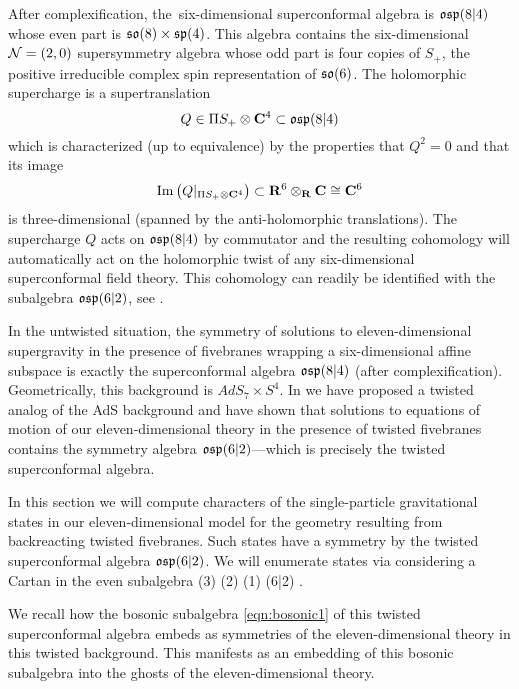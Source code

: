 After complexification, the~six-dimensional superconformal algebra is $\mathfrak{osp}(8|4)$ whose even part is $\mathfrak{so}(8) \times \mathfrak{sp}(4)$. 
This algebra contains the six-dimensional $\mathcal N=(2,0)$ supersymmetry algebra whose odd part is four copies of $S_+$, the positive irreducible complex spin representation of $\mathfrak{so}(6)$.
The holomorphic supercharge is a supertranslation 
\[
Q \in \Pi S_+ \otimes \mathbf{C}^4 \subset \mathfrak{osp}(8|4)
\]
which is characterized (up to equivalence) by the properties that $Q^2 = 0$ and that its image
\[
{\rm Im}\left(Q|_{\Pi S_+ \otimes \mathbf{C}^4} \right) \subset \mathbf{R}^6 \otimes_{\mathbf{R}} \mathbf{C} \cong \mathbf{C}^6
\]
is three-dimensional (spanned by the anti-holomorphic translations). 
The supercharge $Q$ acts on $\mathfrak{osp}(8|4)$ by commutator and the resulting cohomology will automatically act on the holomorphic twist of any six-dimensional superconformal field theory. 
This cohomology can readily be identified with the subalgebra $\mathfrak{osp}(6|2)$, see \cite{SWe36}. 

In the untwisted situation, the symmetry of solutions to eleven-dimensional supergravity in the presence of fivebranes wrapping a six-dimensional affine subspace is exactly the superconformal algebra $\mathfrak{osp}(8|4)$ (after complexification). 
Geometrically, this background is $AdS_7 \times S^4$. 
In \cite{RSW} we have proposed a twisted analog of the AdS background and have shown that solutions to equations of motion of our eleven-dimensional theory in the presence of twisted fivebranes contains the symmetry algebra $\mathfrak{osp}(6|2)$---which is precisely the twisted superconformal algebra.

In this section we will compute characters of the single-particle gravitational states in our eleven-dimensional model for the geometry resulting from backreacting twisted fivebranes.
Such states have a symmetry by the twisted superconformal algebra $\mathfrak{osp}(6|2)$. 
We will enumerate states via considering a Cartan in the even subalgebra
\beqn\label{eqn:bosonic1}
(3) \times {}(2) \times {}(1) \subset {}(6|2) .
\eeqn



We recall how the bosonic subalgebra \eqref{eqn:bosonic1} of this twisted superconformal algebra embeds as symmetries of the eleven-dimensional theory in this twisted background. 
This manifests as an embedding of this bosonic subalgebra into the ghosts of the eleven-dimensional theory. 

